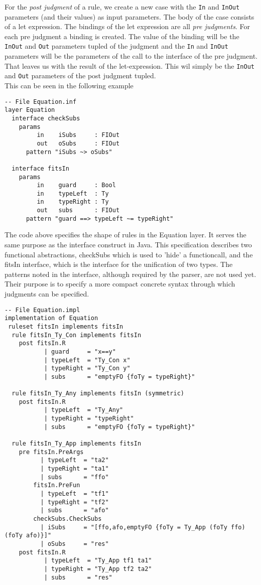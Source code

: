 \documentclass[10pt]{article}
\begin{document}
For the \emph{post judgment} of a rule, we create a new case with the \texttt{In} and \texttt{InOut} parameters (and their values) as input parameters. The body of the case consists of a let expression. The bindings of the let expression are all \emph{pre judgments}. For each pre judgment a binding is created. The value of the binding will be the \texttt{InOut} and \texttt{Out} parameters tupled of the judgment and the \texttt{In} and \texttt{InOut} parameters will be the parameters of the call to the interface of the pre judgment. That leaves us with the result of the let-expression. This wil simply be the \texttt{InOut} and \texttt{Out} parameters of the post judgment tupled. \\

This can be seen in the following example

\begin{verbatim}
-- File Equation.inf
layer Equation
  interface checkSubs
    params
         in    iSubs     : FIOut
         out   oSubs     : FIOut
      pattern "iSubs ~> oSubs"

  interface fitsIn
    params
         in    guard     : Bool
         in    typeLeft  : Ty
         in    typeRight : Ty
         out   subs      : FIOut
      pattern "guard ==> typeLeft ~= typeRight"
\end{verbatim}

The code above specifies the shape of rules in the Equation layer.  It serves the same purpose
as the interface construct in Java.  This specification describes two functional abstractions, checkSubs which is used to 'hide' a functioncall, and the fitsIn interface, which is the  interface for the unification of two types. The patterns noted in the interface, although required by the parser, are not used yet.  Their
purpose is to specify a more compact concrete syntax through which judgments can be specified.

\begin{verbatim}
-- File Equation.impl
implementation of Equation
 ruleset fitsIn implements fitsIn
  rule fitsIn_Ty_Con implements fitsIn
    post fitsIn.R
           | guard     = "x==y"
           | typeLeft  = "Ty_Con x"
           | typeRight = "Ty_Con y"
           | subs      = "emptyFO {foTy = typeRight}"

  rule fitsIn_Ty_Any implements fitsIn (symmetric)
    post fitsIn.R
           | typeLeft  = "Ty_Any"
           | typeRight = "typeRight"
           | subs      = "emptyFO {foTy = typeRight}"

  rule fitsIn_Ty_App implements fitsIn
    pre fitsIn.PreArgs
          | typeLeft  = "ta2"
          | typeRight = "ta1"
          | subs      = "ffo"
        fitsIn.PreFun
          | typeLeft  = "tf1"
          | typeRight = "tf2"
          | subs      = "afo" 
        checkSubs.CheckSubs
          | iSubs     = "[ffo,afo,emptyFO {foTy = Ty_App (foTy ffo) (foTy afo)}]"
          | oSubs     = "res"
    post fitsIn.R
           | typeLeft  = "Ty_App tf1 ta1"
           | typeRight = "Ty_App tf2 ta2"
           | subs      = "res"
\end{verbatim}
\end{document}
